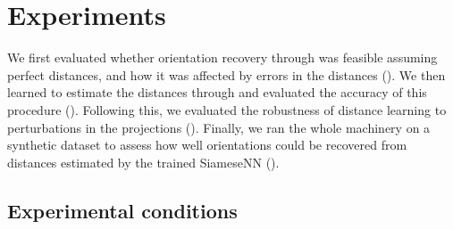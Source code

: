 \section{Experiments}\label{sec:experiments}


We first evaluated whether orientation recovery through  was feasible assuming perfect distances, and how it was affected by errors in the distances ().
We then learned to estimate the distances through  and evaluated the accuracy of this procedure ().
Following this, we evaluated the robustness of distance learning to perturbations in the projections ().
Finally, we ran the whole machinery on a synthetic dataset to assess how well orientations could be recovered from distances estimated by the trained SiameseNN ().


\subsection{Experimental conditions}\label{sec:results:data}

